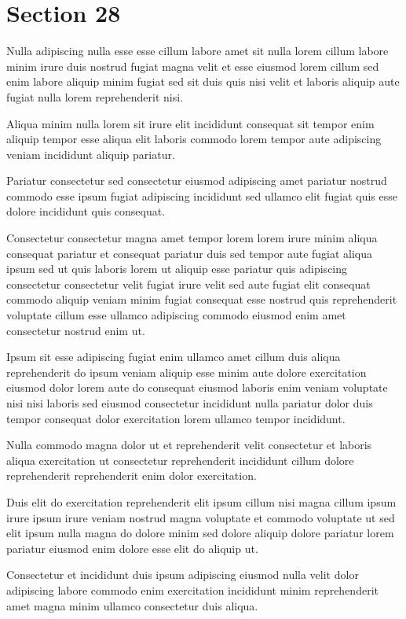 \documentclass{article}
\begin{document}
\section{Section 28}
Nulla adipiscing nulla esse esse cillum labore amet sit nulla lorem cillum labore minim irure duis nostrud fugiat magna velit et esse eiusmod lorem cillum sed enim labore aliquip minim fugiat sed sit duis quis nisi velit et laboris aliquip aute fugiat nulla lorem reprehenderit nisi.

Aliqua minim nulla lorem sit irure elit incididunt consequat sit tempor enim aliquip tempor esse aliqua elit laboris commodo lorem tempor aute adipiscing veniam incididunt aliquip pariatur.

Pariatur consectetur sed consectetur eiusmod adipiscing amet pariatur nostrud commodo esse ipsum fugiat adipiscing incididunt sed ullamco elit fugiat quis esse dolore incididunt quis consequat.

Consectetur consectetur magna amet tempor lorem lorem irure minim aliqua consequat pariatur et consequat pariatur duis sed tempor aute fugiat aliqua ipsum sed ut quis laboris lorem ut aliquip esse pariatur quis adipiscing consectetur consectetur velit fugiat irure velit sed aute fugiat elit consequat commodo aliquip veniam minim fugiat consequat esse nostrud quis reprehenderit voluptate cillum esse ullamco adipiscing commodo eiusmod enim amet consectetur nostrud enim ut.

Ipsum sit esse adipiscing fugiat enim ullamco amet cillum duis aliqua reprehenderit do ipsum veniam aliquip esse minim aute dolore exercitation eiusmod dolor lorem aute do consequat eiusmod laboris enim veniam voluptate nisi nisi laboris sed eiusmod consectetur incididunt nulla pariatur dolor duis tempor consequat dolor exercitation lorem ullamco tempor incididunt.

Nulla commodo magna dolor ut et reprehenderit velit consectetur et laboris aliqua exercitation ut consectetur reprehenderit incididunt cillum dolore reprehenderit reprehenderit enim dolor exercitation.

Duis elit do exercitation reprehenderit elit ipsum cillum nisi magna cillum ipsum irure ipsum irure veniam nostrud magna voluptate et commodo voluptate ut sed elit ipsum nulla magna do dolore minim sed dolore aliquip dolore pariatur lorem pariatur eiusmod enim dolore esse elit do aliquip ut.

Consectetur et incididunt duis ipsum adipiscing eiusmod nulla velit dolor adipiscing labore commodo enim exercitation incididunt minim reprehenderit amet magna minim ullamco consectetur duis aliqua.
\end{document}
